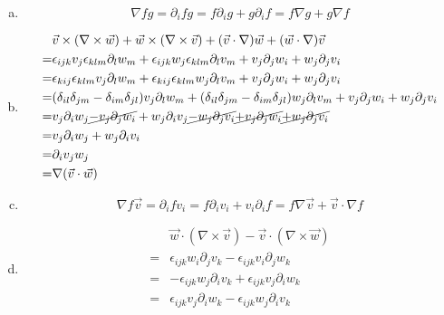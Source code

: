 \documentclass[a4paper,german,12pt,smallheadings]{scrartcl}
\begin{document}
\begin{enumerate}[a)]
  \item
    \begin{equation}
      \nabla fg = \partial_i f g = f \partial_i g + g \partial_i f = f \nabla g + g \nabla f
    \end{equation}
  \item
    \begin{align}
      &\vec{v} \times (\nabla \times \vec{w}) + \vec{w} \times (\nabla \times \vec{v}) + (\vec{v} \cdot \nabla) \vec{w} + (\vec{w} \cdot \nabla) \vec{v} \\
      = &\epsilon_{ijk} v_j \epsilon_{klm} \partial_l w_m + \epsilon_{ijk} w_j \epsilon_{klm} \partial_l v_m + v_j \partial_j w_i + w_j \partial_j v_i\\
      = &\epsilon_{kij} \epsilon_{klm} v_j \partial_l w_m + \epsilon_{kij} \epsilon_{klm} w_j \partial_l v_m + v_j \partial_j w_i + w_j \partial_j v_i\\
      = &(\delta_{il} \delta_{jm} - \delta_{im} \delta_{jl}) v_j \partial_l w_m + (\delta_{il} \delta_{jm} - \delta_{im}\delta_{jl}) w_j \partial_l v_m + v_j \partial_j w_i + w_j \partial_j v_i\\
      = &v_j \partial_i w_j \cancel{- v_j \partial_j w_i} + w_j \partial_i v_j \cancel{- w_j \partial_j v_i} \cancel{+ v_j \partial_j w_i} \cancel{+ w_j \partial_j v_i}\\
      = &v_j \partial_i w_j + w_j \partial_i v_i\\
      = &\partial_i v_j w_j\\
      = &\nabla(\vec{v} \cdot \vec{w})
    \end{align}
  \item
    \begin{equation}
      \nabla f \vec{v}
      = \partial_i f v_i
      = f \partial_i v_i + v_i \partial_i f
      = f \nabla \vec{v} + \vec{v} \cdot \nabla f
    \end{equation}
  \item
    \begin{align}
      &\vec{w} \cdot (\nabla \times \vec{v}) - \vec{v} \cdot (\nabla \times \vec{w}) \\
      =  &\epsilon_{ijk}w_i\partial_jv_k - \epsilon_{ijk} v_i \partial_j w_k \\
      = &-\epsilon_{ijk} w_j \partial_ iv_k + \epsilon_{ijk} v_j \partial_i w_k \\
      =  &\epsilon_{ijk} v_j \partial_i w_k - \epsilon_{ijk} w_j \partial_i v_k \\

\end{align}
\end{enumerate}
\end{document}
